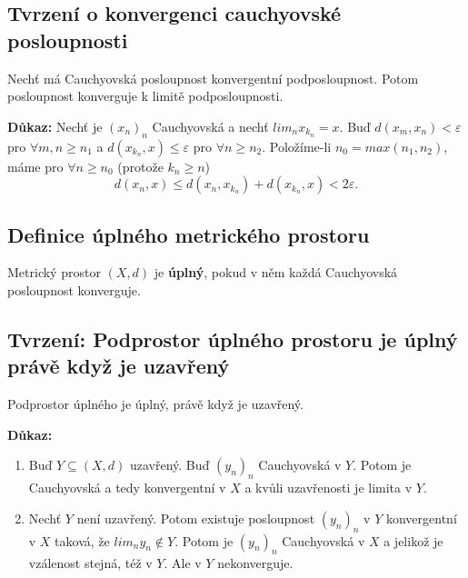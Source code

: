 \documentclass[../main.tex]{subfiles}
\begin{document}
\subsection{Tvrzení o konvergenci cauchyovské posloupnosti}
\hspace{1.2mm}
\noindent
Nechť má Cauchyovská posloupnost konvergentní podposloupnost. Potom posloupnost konverguje k limitě
podposloupnosti.

\vspace{5mm}
\noindent
\textbf{Důkaz:} Nechť je $(x_n)_n$ Cauchyovská a nechť $lim_{n}x_{k_n} = x.$ Buď $d(x_m,x_n) < \varepsilon$ pro $ \forall m,n \geq n_1$ 
a $d(x_{k_n},x) \leq \varepsilon$ pro $\forall n \geq n_2$. Položíme-li $n_0 = max(n_1,n_2)$, máme pro $\forall n \geq n_0$ (protože $k_n \geq n$)
\[d(x_n,x) \leq d(x_n,x_{k_n}) + d(x_{k_n},x) < 2\varepsilon.\]

\subsection{Definice úplného metrického prostoru}
\hspace{1.2mm}
\noindent
Metrický prostor $(X,d)$ je \textbf{úplný}, pokud v něm každá Cauchyovská posloupnost konverguje.

\subsection{Tvrzení: Podprostor úplného prostoru je úplný právě když je uzavřený}
\hspace{1.2mm}
\noindent
Podprostor úplného je úplný, právě když je uzavřený.

\vspace{5mm}
\noindent
\textbf{Důkaz:} 
\begin{enumerate}
    \item Buď $Y \subseteq (X,d)$ uzavřený. Buď $(y_n)_n$ Cauchyovská v $Y$. Potom je Cauchyovská 
    a tedy konvergentní v $X$ a kvůli uzavřenosti je limita v $Y$.
    \item Nechť $Y$ není uzavřený. Potom existuje posloupnost $(y_n)_n$ v $Y$ konvergentní v $X$ taková, že $lim_n y_n \notin Y$.
    Potom je $(y_n)_n$ Cauchyovská v $X$ a jelikož je vzálenost stejná, též v $Y$. Ale v $Y$ nekonverguje.
\end{enumerate}
\end{document}
